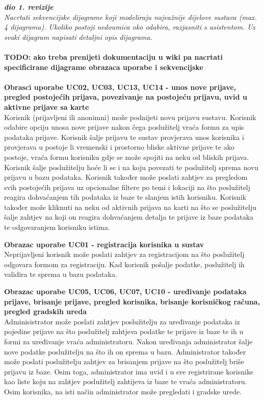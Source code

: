 				\textbf{\textit{dio 1. revizije}}\\
				
				
				\textit{Nacrtati sekvencijske dijagrame koji modeliraju najvažnije dijelove sustava (max. 4 dijagrama). Ukoliko postoji nedoumica oko odabira, razjasniti s asistentom. Uz svaki dijagram napisati detaljni opis dijagrama.}
				\\
				\\
				\textbf{TODO: ako treba prenijeti dokumentaciju u wiki pa nacrtati specificirane dijagrame obrazaca uporabe i sekvencijske}
				\\
				\\
				\textbf{Obrasci uporabe UC02, UC03, UC13, UC14 - unos nove prijave, pregled postojećih prijava, povezivanje na postojeću prijavu, uvid u aktivne prijave sa karte}\\
				Korisnik (prijavljeni ili anonimni) može podnijeti novu prijavu sustavu. Korisnik odabire opciju unosa nove prijave nakon čega poslužitelj vraća formu za upis podataka prijave. 
				Korisnik šalje prijavu te sustav provjerava unos korisnika i provjerava u postoje li vremenski i prostorno bliske aktivne prijave te ako postoje, vraća formu korisniku gdje se može spojiti na neku od bliskih prijava. 
				Korisnik šalje poslužitelju hoće li se i na koju povezati te poslužitelj sprema novu prijavu u bazu podataka. Korisnik također može poslati zahtjev za pregledom svih postojećih prijava uz opcionalne filtere po temi i lokaciji na što poslužitelj reagira dohvaćanjem tih podataka iz baze te slanjem istih korisniku. 
				Korisnik također može kliknuti na neku od aktivnih prijava na karti na što se poslužitelju šalje zahtjev na koji on reagira dohvaćanjem detalja te prijave iz baze podataka te odgovaranjem korisniku istima.
				
				
				\textbf{Obrazac uporabe UC01 - registracija korisnika u sustav}\\
				Neprijavljeni korisnik može poslati zahtjev za registracijom na što poslužitelj odgovara formom za registraciju. Kad korisnik pošalje podatke, poslužitelj ih validira te sprema u bazu podataka.

				\textbf{Obrazac uporabe UC05, UC06, UC07, UC10 - uređivanje podataka prijave, brisanje prijave, pregled korisnika, brisanje korisničkog računa, pregled gradskih ureda}\\
				Adminisistrator može poslati zahtjev poslužitelju za uređivanje podataka iz pojedine prijave na što poslužitelj zahtjeva podatke te prijave iz baze te ih u formi za uređivanje vraća administratoru. Nakon uređivanja administrator šalje nove podatke poslužitelju na što ih on sprema u bazu.
				Administrator također može poslati poslužitelju zahtjev za brisanjem prijave na što poslužitelj briše prijavu iz baze.
				Osim toga, administrator ima uvid i u sve registrirane korisnike kao liste koju na zahtjev poslužitelj zahtijeva iz baze te vraća administratoru.
				Osim korisnika, na isti način administrator može pregledati i gradske urede.

